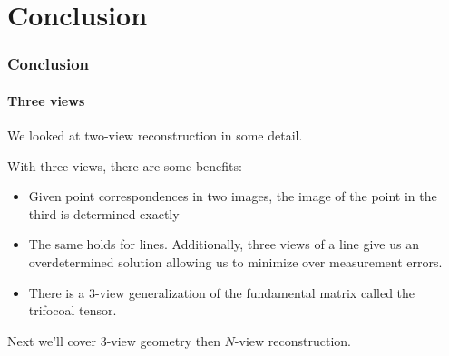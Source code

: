 \documentclass[aspectratio=169]{beamer}
\begin{document}
\section{Conclusion}

\begin{frame}
\frametitle{Conclusion}
\framesubtitle{Three views}

We looked at \alert{two-view} reconstruction in some detail.

\medskip

With \alert{three views}, there are some benefits:
\begin{itemize}
\item Given point correspondences in two images, the
  image of the point in the third is determined \alert{exactly}
\item The same holds for lines.  Additionally, three views of a line
  give us an \alert{overdetermined} solution allowing us to minimize
  over measurement errors.
\item There is a 3-view generalization of the fundamental matrix
  called the trifocoal tensor.
\end{itemize}

\medskip

Next we'll cover 3-view geometry then $N$-view reconstruction.

\end{frame}
\end{document}
